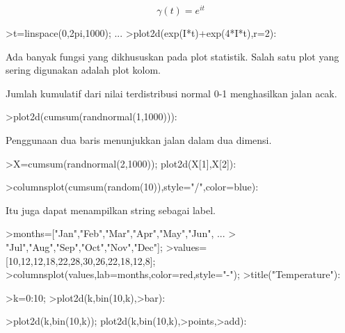 \documentclass{article}
\begin{document}
\begin{eulernotebook}
\begin{eulercomment}
\begin{eulercomment}
\begin{eulercomment}
\begin{eulercomment}
\begin{eulercomment}
\begin{eulercomment}
\begin{eulercomment}
\begin{eulercomment}
\begin{eulercomment}
\begin{eulercomment}
\begin{eulercomment}
\begin{eulercomment}
\begin{eulercomment}
\begin{eulercomment}
\begin{eulercomment}
\end{eulercomment}
\begin{eulerformula}
\[
\gamma(t) = e^{it}
\]
\end{eulerformula}
\begin{eulerprompt}
>t=linspace(0,2pi,1000); ...
>plot2d(exp(I*t)+exp(4*I*t),r=2):
\end{eulerprompt}
\begin{eulercomment}
Ada banyak fungsi yang dikhususkan pada plot statistik. Salah satu
plot yang sering digunakan adalah plot kolom.

Jumlah kumulatif dari nilai terdistribusi normal 0-1 menghasilkan
jalan acak.
\end{eulercomment}
\begin{eulerprompt}
>plot2d(cumsum(randnormal(1,1000))):
\end{eulerprompt}
\begin{eulercomment}
Penggunaan dua baris menunjukkan jalan dalam dua dimensi.
\end{eulercomment}
\begin{eulerprompt}
>X=cumsum(randnormal(2,1000)); plot2d(X[1],X[2]):
\end{eulerprompt}
\begin{eulerprompt}
>columnsplot(cumsum(random(10)),style="/",color=blue):
\end{eulerprompt}
\begin{eulercomment}
Itu juga dapat menampilkan string sebagai label.
\end{eulercomment}
\begin{eulerprompt}
>months=["Jan","Feb","Mar","Apr","May","Jun", ...
>  "Jul","Aug","Sep","Oct","Nov","Dec"];
>values=[10,12,12,18,22,28,30,26,22,18,12,8];
>columnsplot(values,lab=months,color=red,style="-");
>title("Temperature"):
\end{eulerprompt}
\begin{eulerprompt}
>k=0:10;
>plot2d(k,bin(10,k),>bar):
\end{eulerprompt}
\begin{eulerprompt}
>plot2d(k,bin(10,k)); plot2d(k,bin(10,k),>points,>add):
\end{eulerprompt}

\end{eulercomment}
\end{eulercomment}
\end{eulercomment}
\end{eulercomment}
\end{eulercomment}
\end{eulercomment}
\end{eulercomment}
\end{eulercomment}
\end{eulercomment}
\end{eulercomment}
\end{eulercomment}
\end{eulercomment}
\end{eulercomment}
\end{eulercomment}
\end{eulernotebook}
\end{document}
